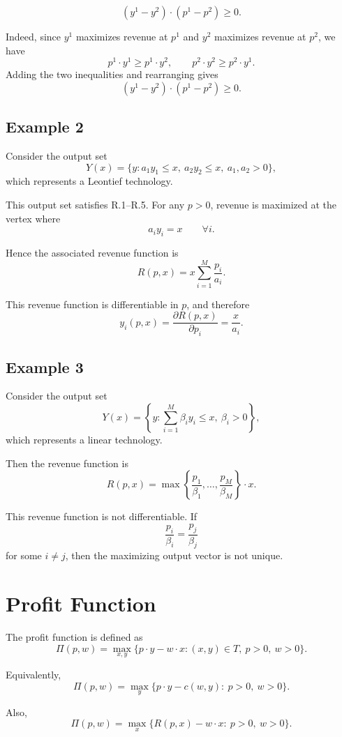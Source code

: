 \[
(y^1-y^2)\cdot (p^1-p^2) \ge 0.
\]

Indeed, since $y^1$ maximizes revenue at $p^1$ and $y^2$ maximizes revenue at $p^2$,
we have
\[
p^1 \cdot y^1 \ge p^1 \cdot y^2,
\qquad
p^2 \cdot y^2 \ge p^2 \cdot y^1.
\]
Adding the two inequalities and rearranging gives
\[
(y^1-y^2)\cdot (p^1-p^2) \ge 0.
\]

\subsection*{Example 2}

Consider the output set
\[
Y(x)=\{y : a_1 y_1 \le x,\ a_2 y_2 \le x,\ a_1,a_2>0\},
\]
which represents a Leontief technology.

This output set satisfies R.1--R.5.
For any $p>0$, revenue is maximized at the vertex where
\[
a_i y_i = x
\qquad \forall i.
\]

Hence the associated revenue function is
\[
R(p,x)
=
x \sum_{i=1}^M \frac{p_i}{a_i}.
\]

This revenue function is differentiable in $p$, and therefore
\[
y_i(p,x)
=
\frac{\partial R(p,x)}{\partial p_i}
=
\frac{x}{a_i}.
\]

\subsection*{Example 3}

Consider the output set
\[
Y(x)=\left\{y : \sum_{i=1}^M \beta_i y_i \le x,\ \beta_i>0\right\},
\]
which represents a linear technology.



Then the revenue function is
\[
R(p,x)
=
\max \left\{ \frac{p_1}{\beta_1}, \dots, \frac{p_M}{\beta_M} \right\} \cdot x.
\]

This revenue function is not differentiable.
If
\[
\frac{p_i}{\beta_i} = \frac{p_j}{\beta_j}
\]
for some $i \ne j$, then the maximizing output vector is not unique.

\section{Profit Function}

The profit function is defined as
\[
\Pi(p,w)
=
\max_{x,y} \{p\cdot y - w\cdot x : (x,y)\in T,\ p>0,\ w>0\}.
\tag{1}
\]

Equivalently,
\[
\Pi(p,w)
=
\max_{y} \{p\cdot y - c(w,y) : \ p>0,\ w>0\}.
\tag{2}
\]

Also,
\[
\Pi(p,w)
=
\max_{x} \{R(p,x) - w\cdot x : \ p>0,\ w>0\}.
\tag{3}
\]

